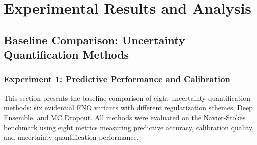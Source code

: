 \chapter{Experimental Results and Analysis}

\section{Baseline Comparison: Uncertainty Quantification Methods}

\subsection{Experiment 1: Predictive Performance and Calibration}

This section presents the baseline comparison of eight uncertainty quantification methods: six evidential FNO variants with different regularization schemes, Deep Ensemble, and MC Dropout. All methods were evaluated on the Navier-Stokes benchmark using eight metrics measuring predictive accuracy, calibration quality, and uncertainty quantification performance.


